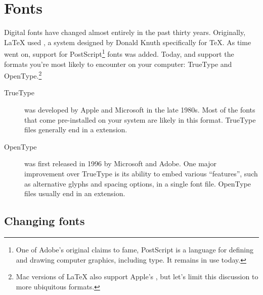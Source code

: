 \chapter{Fonts}
\label{fonts}

Digital fonts have changed almost entirely in the past thirty years.
Originally, \LaTeX{} used \MF,
a system designed by Donald Knuth specifically for \TeX{}.
As time went on, support for PostScript\footnote{One of
Adobe's original claims to fame,
PostScript is a language for defining and drawing computer graphics,
including type. It remains in use today.} fonts was added.
Today, \LuaLaTeX{} and \XeLaTeX{} support the formats you're
most likely to encounter on your computer:
TrueType and OpenType.\punckern\footnote{Mac versions of \LaTeX{} also support
Apple's , but let's limit this discussion to
more ubiquitous formats.}

\begin{description}
\item[TrueType] was developed by Apple and Microsoft in the late 1980s.
    Most of the fonts that come pre-installed on your system are likely
    in this format.
    TrueType files generally end in a  extension.
\item[OpenType] was first released in 1996 by Microsoft and Adobe.
    One major improvement over TrueType is its ability to embed
    various ``features''\quotekern, such as alternative glyphs
    and spacing options, in a single font file.
    OpenType files usually end in an  extension.
\end{description}

\section{Changing fonts}

